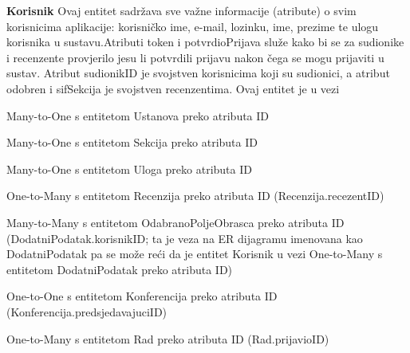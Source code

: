 				\textbf{Korisnik}
				Ovaj entitet sadržava sve važne informacije (atribute) o svim korisnicima aplikacije: korisničko ime, e-mail, lozinku, ime, prezime te ulogu korisnika u sustavu.Atributi token i potvrdioPrijava služe kako bi se za sudionike i recenzente provjerilo jesu li potvrdili prijavu nakon čega se mogu prijaviti u sustav. Atribut sudionikID je svojstven korisnicima koji su sudionici, a atribut odobren i sifSekcija je svojstven recenzentima. Ovaj entitet je u vezi \begin{packed_item} 
					\item Many-to-One s entitetom Ustanova preko atributa ID
					\item Many-to-One s entitetom Sekcija preko atributa ID
					\item Many-to-One s entitetom Uloga preko atributa ID
					\item One-to-Many s entitetom Recenzija preko atributa ID (Recenzija.recezentID)
					\item Many-to-Many s entitetom OdabranoPoljeObrasca preko atributa ID (DodatniPodatak.korisnikID; ta je veza na ER dijagramu imenovana kao DodatniPodatak pa se može reći da je entitet Korisnik u vezi One-to-Many s entitetom DodatniPodatak preko atributa ID)
					\item One-to-One s entitetom Konferencija preko atributa ID \newline (Konferencija.predsjedavajuciID)
					\item One-to-Many s entitetom Rad preko atributa ID (Rad.prijavioID)
				\end{packed_item}
